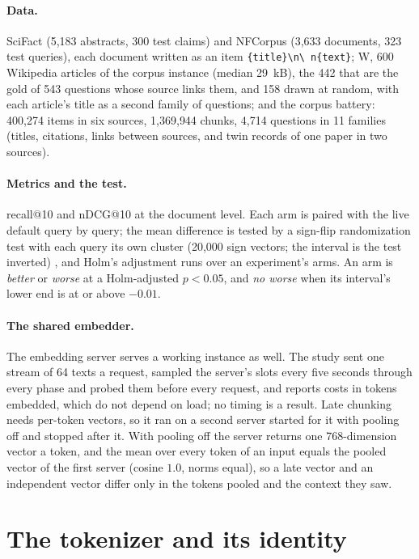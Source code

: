 \documentclass[11pt]{article}
\theoremstyle{plain}
\theoremstyle{definition}
\theoremstyle{remark}
\newcommand{\code}[1]{\texttt{#1}}
\begin{document}
\paragraph{Data.} SciFact (5{,}183 abstracts, 300 test claims) and NFCorpus (3{,}633 documents,
323 test queries), each document written as an item \code{\{title\}\textbackslash n\textbackslash
n\{text\}}; W, 600 Wikipedia articles of the corpus instance (median 29~kB), the 442 that are the
gold of 543 questions whose source links them, and 158 drawn at random, with each article's title
as a second family of questions; and the corpus battery: 400{,}274 items in six sources, 1{,}369{,}944
chunks, 4{,}714 questions in 11 families (titles, citations, links between sources, and twin
records of one paper in two sources).

\paragraph{Metrics and the test.} recall@10 and nDCG@10 at the document level. Each arm is paired
with the live default query by query; the mean difference is tested by a sign-flip randomization
test with each query its own cluster (20{,}000 sign vectors; the interval is the test inverted)
\citep{good2005,phipson2010}, and Holm's adjustment \citep{holm1979simple} runs over an
experiment's arms. An arm is \emph{better} or \emph{worse} at a Holm-adjusted $p < 0.05$, and
\emph{no worse} when its interval's lower end is at or above $-0.01$.

\paragraph{The shared embedder.} The embedding server serves a working instance as well. The
study sent one stream of 64 texts a request, sampled the server's slots every five seconds through
every phase and probed them before every request, and reports costs in tokens embedded, which do
not depend on load; no timing is a result. Late chunking needs per-token vectors, so it ran on a
second server started for it with pooling off and stopped after it. With pooling off the server
returns one 768-dimension vector a token, and the mean over every token of an input equals the
pooled vector of the first server (cosine $1.0$, norms equal), so a late vector and an independent
vector differ only in the tokens pooled and the context they saw.

\section{The tokenizer and its identity}\label{sec:tokenizer}
\end{document}
